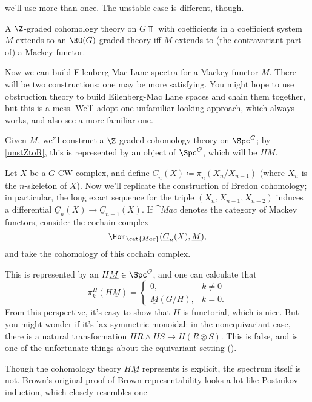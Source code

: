 we'll use more than once. The unstable case is different, though.
\begin{cor}
\label{unstZtoR}
A $\Z$-graded cohomology theory on $G\Top$ with coefficients in a coefficient system $M$ extends to an
$\RO(G)$-graded theory iff $M$ extends to (the contravariant part of) a Mackey functor.
\end{cor}
Now we can build Eilenberg-Mac Lane spectra for a Mackey functor $\underline M$. There will be two constructions:
one may be more satisfying. You might hope to use obstruction theory to build Eilenberg-Mac Lane spaces and chain
them together, but this is a mess. We'll adopt one unfamiliar-looking approach, which always works, and also see a
more familiar one.
\begin{cons}
Given $\underline M$, we'll construct a $\Z$-graded cohomology theory on $\Spc^G$; by \cref{unstZtoR}, this is
represented by an object of $\Spc^G$, which will be $H\underline M$.

Let $X$ be a $G$-CW complex, and define $\underline C_n(X)\coloneqq \underline\pi_n(X_n/X_{n-1})$ (where $X_n$ is
the $n$-skeleton of $X$). Now we'll replicate the construction of Bredon cohomology; in
particular, the long exact sequence for the triple $(X_n, X_{n-1}, X_{n-2})$ induces a differential $\underline
C_n(X)\to\underline C_{n-1}(X)$. If $\cat{Mac}$ denotes the category of Mackey functors, consider the cochain
complex
\[\Hom_{\cat{Mac}}(\underline C_n(X), \underline M),\]
and take the cohomology of this cochain complex.

This is represented by an  $H\underline M\in\Spc^G$, and one can calculate that
\[\pi_k^H(H\underline M) = \begin{cases}
	0, &k\ne 0\\
	\underline M(G/H), &k = 0.
\end{cases}\]
From this perspective, it's easy to show that $H$ is functorial, which is nice. But you might wonder if it's lax
symmetric monoidal: in the nonequivariant case, there is a natural transformation $HR\wedge HS \to H(R\otimes S)$. This is false, and is one of
the unfortunate things about the equivariant setting (\cite[Theorem 6.2]{Ullman}).  \end{cons}
Though the cohomology theory $H\underline M$ represents is explicit, the spectrum itself is not. Brown's original
proof of Brown representability \cite{Brown} looks a lot like Postnikov induction, which closely resembles one
